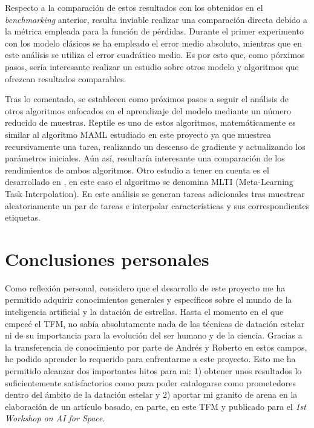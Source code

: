 Respecto a la comparación de estos resultados con los obtenidos en el \emph{benchmarking} anterior, resulta inviable realizar una comparación directa debido a la métrica empleada para la función de pérdidas. Durante el primer experimento con los modelo clásicos se ha empleado el error medio absoluto, mientras que en este análisis se utiliza el error cuadrático medio. Es por esto que, como pórximos pasos, sería interesante realizar un estudio sobre otros modelo y algoritmos que ofrezcan resultados comparables.

Tras lo comentado, se establecen como próximos pasos a seguir el análisis de otros algoritmos enfocados en el aprendizaje del modelo mediante un número reducido de muestras. Reptile \cite{nichol2018firstorder} es uno de estos algoritmos, matemáticamente es similar al algoritmo MAML estudiado en este proyecto ya que muestrea recursivamente una tarea, realizando un descenso de gradiente y actualizando los parámetros iniciales. Aún así, resultaría interesante una comparación de los rendimientos de ambos algoritmos. Otro estudio a tener en cuenta es el desarrollado en \cite{yao2021metalearning}, en este caso el algoritmo se denomina MLTI (Meta-Learning Task Interpolation). En este análisis se generan tareas adicionales tras muestrear aleatoriamente un par de tareas e interpolar características y sus correspondientes etiquetas.
 

\section{Conclusiones personales}

Como reflexión personal, considero que el desarrollo de este proyecto me ha permitido adquirir conocimientos generales y específicos sobre el mundo de la inteligencia artificial y la datación de estrellas. Hasta el momento en el que empecé el TFM, no sabía absolutamente nada de las técnicas de datación estelar ni de su importancia para la evolución del ser humano y de la ciencia. Gracias a la transferencia de conocimiento por parte de Andrés y Roberto en estos campos, he podido aprender lo requerido para enfrentarme a este proyecto. Esto me ha permitido alcanzar dos importantes hitos para mi: 1) obtener unos resultados lo suficientemente satisfactorios como para poder catalogarse como prometedores dentro del ámbito de la datación estelar y 2) aportar mi granito de arena en la elaboración de un artículo basado, en parte, en este TFM y publicado para el \emph{1st Workshop on AI for Space}. 

